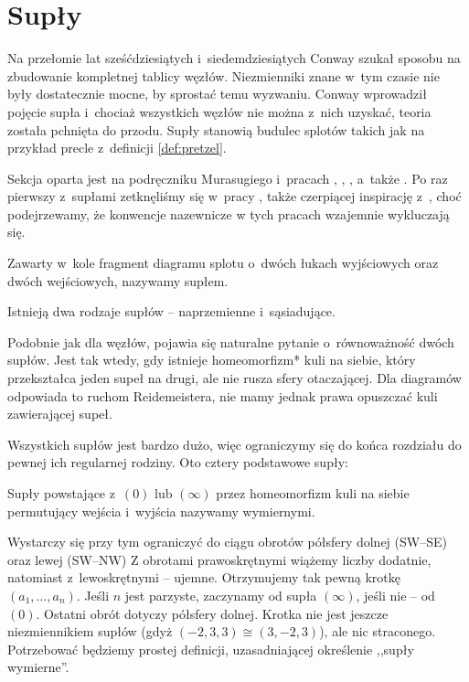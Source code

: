 \section{Supły} %
\label{sec:tangle}

Na przełomie lat sześćdziesiątych i~siedemdziesiątych Conway szukał sposobu na zbudowanie kompletnej tablicy węzłów.
Niezmienniki znane w~tym czasie nie były dostatecznie mocne, by sprostać temu wyzwaniu.
Conway wprowadził pojęcie supła i~chociaż wszystkich węzłów nie można z~nich uzyskać, teoria została pchnięta do przodu.
Supły stanowią budulec splotów takich jak na przykład precle z~definicji \ref{def:pretzel}.

Sekcja oparta jest na podręczniku Murasugiego \cite{murasugi96} i~pracach \cite{conway70}, \cite{kauffman97}, \cite{kauffman04}, a~także \cite{schubert56}.
Po raz pierwszy z~supłami zetknęliśmy się w~pracy \cite{janiak04}, także czerpiącej inspirację z~\cite{murasugi96}, choć podejrzewamy, że konwencje nazewnicze w tych pracach wzajemnie wykluczają się.

\begin{definition}[supeł]
    \label{def:tangle}
    Zawarty w~kole fragment diagramu splotu o~dwóch łukach wyjściowych oraz dwóch wejściowych, nazywamy supłem.
\end{definition}

Istnieją dwa rodzaje supłów -- naprzemienne i~sąsiadujące.


Podobnie jak dla węzłów, pojawia się naturalne pytanie o~równoważność dwóch supłów.
Jest tak wtedy, gdy istnieje homeomorfizm* kuli na siebie, który przekształca jeden supeł na drugi, ale nie rusza sfery otaczającej.
Dla diagramów odpowiada to ruchom Reidemeistera, nie mamy jednak prawa opuszczać kuli zawierającej supeł.

Wszystkich supłów jest bardzo dużo, więc ograniczymy się do końca rozdziału do pewnej ich regularnej rodziny.
Oto cztery podstawowe supły:


\begin{definition}
    \label{def:rational_tangle}
    Supły powstające z~$(0)$ lub $(\infty)$ przez homeomorfizm kuli na siebie permutujący wejścia i~wyjścia nazywamy wymiernymi.
\end{definition}

Wystarczy się przy tym ograniczyć do ciągu obrotów półsfery dolnej (SW--SE) oraz lewej (SW--NW)
Z obrotami prawoskrętnymi wiążemy liczby dodatnie, natomiast z~lewoskrętnymi -- ujemne.
Otrzymujemy tak pewną krotkę $(a_1, \ldots, a_n)$.
Jeśli $n$ jest parzyste, zaczynamy od supła $(\infty)$, jeśli nie -- od $(0)$.
Ostatni obrót dotyczy półsfery dolnej.
Krotka nie jest jeszcze niezmiennikiem supłów (gdyż $(-2,3,3) \cong (3, -2, 3)$), ale nic straconego.
Potrzebować będziemy prostej definicji, uzasadniającej określenie ,,supły wymierne''.

